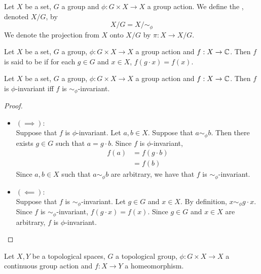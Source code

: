 \documentclass{book}
\begin{document}
	\begin{defn}
		Let $X$ be a set, $G$ a group and $\phi: G \times X \rightarrow X$ a group action. We define the , denoted $X / G$, by 
		$$X/ G = X / \sim_{\phi}$$
		We denote the projection from $X$ onto $X/G$ by $\pi: X \rightarrow X/ G$.
	\end{defn}
	
	\begin{defn}
	Let $X$ be a set, $G$ a group, $\phi: G \times X \rightarrow X$ a group action and $f:X \rightarrow \mathbb{C}$. Then $f$ is said to be  if for each $g \in G$ and $x \in X$, $f(g \cdot x) = f(x)$.
	\end{defn}
	
	\begin{ex}
	Let $X$ be a set, $G$ a group, $\phi: G \times X \rightarrow X$ a group action and $f:X \rightarrow \mathbb{C}$. Then $f$ is $\phi$-invariant iff $f$ is $\sim_{\phi}$-invariant.  
	\end{ex}
	
	\begin{proof}\
		\begin{itemize}
		\item $(\implies):$ \\ 
		Suppose that $f$ is $\phi$-invariant. Let $a,b \in X$. Suppose that $a \sim_{\phi} b$. Then there exists $g \in G$ such that $a = g \cdot b$. Since $f$ is $\phi$-invariant, 
		\begin{align*}
			f(a)
			& = f(g \cdot b) \\
			& = f(b)		
		\end{align*}
		Since $a,b \in X$ such that $a \sim_{\phi} b$ are arbitrary, we have that $f$ is $\sim_{\phi}$-invariant.
 		\item $(\impliedby):$ \\
 		Suppose that $f$ is $\sim_{\phi}$-invariant. Let  $g \in G$ and $x \in X$. By definition, $x \sim_{\phi} g \cdot x$. Since $f$ is $\sim_{\phi}$-invariant, $f(g \cdot x) = f(x)$. Since $g \in G$ and $x \in X$ are arbitrary, $f$ is $\phi$-invariant.
		\end{itemize}
	\end{proof}
	
	\begin{ex}
		Let $X, Y$ be a topological spaces, $G$ a topological group, $\phi: G \times X \rightarrow X$ a continuous group action and $f:X \rightarrow Y$ a homeomorphism.
	\end{ex}

	
	
\end{document}
